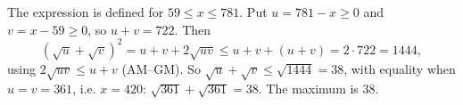The expression is defined for $59\le x\le781$. Put $u=781-x\ge0$ and $v=x-59\ge0$, so $u+v=722$. Then
\[\left(\sqrt u+\sqrt v\right)^2=u+v+2\sqrt{uv}\le u+v+(u+v)=2\cdot722=1444,\]
using $2\sqrt{uv}\le u+v$ (AM--GM). So $\sqrt u+\sqrt v\le\sqrt{1444}=38$, with equality when $u=v=361$, i.e. $x=420$: $\sqrt{361}+\sqrt{361}=38$. The maximum is $\boxed{38}$.
